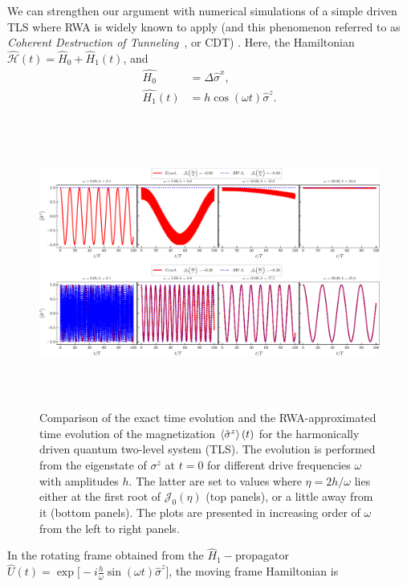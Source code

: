 \documentclass[aps,prb,reprint,showpacs,floatfix,superscriptaddress, onecolumn, nofootinbib, 9pt]{revtex4-2}
\newcommand{\ar}[1]{{\color{blue}#1}} %
\begin{document}
\begin{enumerate}
{     We can strengthen our argument with numerical simulations of a simple driven TLS  where RWA is widely known to apply (and this phenomenon referred to as \textit{Coherent Destruction of Tunneling}~\cite{Grossmann1991, Ashhab2007}, or CDT) . Here, the Hamiltonian $\hat{\mathcal{H}}(t) = \hat{H}_0 + \hat{H}_1(t)$, and  
    \begin{align}
    \hat{H_0} &= \Delta \hat{\sigma}^x,\nonumber \\
    \hat{H_1}(t) &= h \cos(\omega t)\hat{\sigma}^z.
    \end{align}}
 \begin{figure}[t!]
	\begin{center}
		\includegraphics[height=9.5cm]{rwa_vs_exact_w_low_n_high_frz_nfrz.pdf}
	\end{center}
	\caption[] {Comparison of the exact time evolution and the RWA-approximated time evolution of the magnetization $\expval{\hat{\sigma}^z}(t)$ for the harmonically driven quantum two-level system (TLS). The evolution is performed from the eigenstate of $\sigma^z$ at $t=0$ for different drive frequencies $\omega$ with amplitudes $h$. The latter are set to values where $\eta=2h/\omega$ lies either at the first root of $\mathcal{J}_0(\eta)$ (top panels), or a little away from it (bottom panels). The plots are presented in increasing order of $\omega$ from the left to right panels.}
	\label{Fig:compare_exact_rwa}
\end{figure}
    \ar{In the rotating frame obtained from the $\hat{H}_1-$propagator $\hat{U}(t) = \exp\big[-i \frac{h}{\omega} \sin(\omega t)\hat{\sigma}^z\big]$, the moving frame Hamiltonian is
    \begin{align}

\end{align}}
\end{enumerate}
\end{document}
